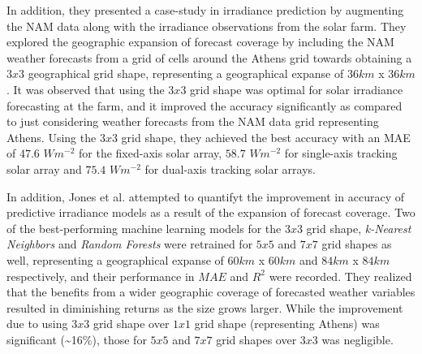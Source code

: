 \par In addition, they presented a case-study in irradiance prediction by augmenting the NAM data along with the irradiance observations from the solar farm. They explored the geographic expansion of forecast coverage by including the NAM weather forecasts from a grid of cells around the Athens grid towards obtaining a $3 x 3$ geographical grid shape, representing a geographical expanse of $36km$ x $36km$. It was observed that using the $3 x 3$ grid shape was optimal for solar irradiance forecasting at the farm, and it improved the accuracy significantly as compared to just considering weather forecasts from the NAM data grid representing Athens. Using the $3 x 3$ grid shape, they achieved the best accuracy with an MAE of $47.6$ $Wm^{-2}$ for the fixed-axis solar array, $58.7$ $Wm^{-2}$ for single-axis tracking solar array and $75.4$ $Wm^{-2}$ for dual-axis tracking solar arrays.

\par In addition, Jones et al. attempted to quantifyt the improvement in accuracy of predictive irradiance models as a result of the expansion of forecast coverage. Two of the best-performing machine learning models for the $3 x 3$ grid shape, \textit{k-Nearest Neighbors} and \textit{Random Forests} were retrained for $5 x 5$ and $7 x 7$ grid shapes as well, representing a geographical expanse of $60km$ x $60km$ and $84km$ x $84km$ respectively, and their performance in $MAE$ and $R^2$ were recorded. They realized that the benefits from a wider geographic coverage of forecasted weather variables resulted in diminishing returns as the size grows larger. While the improvement due to using $3 x 3$ grid shape over $1 x 1$ grid shape (representing Athens) was significant (\textasciitilde 16\%), those for $5 x 5$ and $7 x 7$ grid shapes over $3 x 3$ was negligible.
\newpage